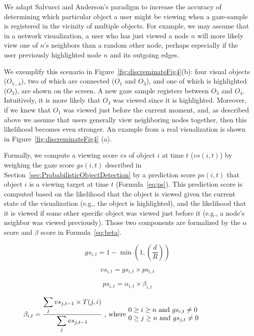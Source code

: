 We adapt Salvucci and Anderson's paradigm to increase the accuracy of determining which particular object a user might be viewing when a gaze-sample is registered in the vicinity of multiple objects. For example, we may assume that in a network visualization, a user who has just viewed a node $n$ will more likely view one of $n$'s neighbors than a random other node, perhaps especially if the user previously highlighted node $n$ and its outgoing edges.  

We exemplify this scenario in Figure~\ref{fig:discreminateFig4}(b): four visual objects ($O_{1\ldots 4}$), two of which are connected ($O_1$ and $O_3$), and one of which is highlighted ($O_3$), are shown on the screen. A new gaze sample registers between $O_3$ and $O_4$. Intuitively, it is more likely that $O_3$ was viewed since it is highlighted. Moreover, if we knew that $O_1$ was viewed just before the current moment, and, as described above we assume that users generally view neighboring nodes together, then this likelihood becomes even stronger.  An example from a real visualization is shown in Figure~\ref{fig:discreminateFig4} (a).

Formally, we compute a viewing score $vs$ of object $i$ at time $t$ ($vs(i,t)$) by weighing the gaze score $gs(i,t)$ described in Section~\ref{sec:ProbabilisticObjectDetection} by a prediction score $ps(i,t)$ that object $i$ is a viewing target at time $t$ (Formula~\ref{eq:ps}). This prediction score is computed based on the likelihood that the object is viewed given the current state of the visualization (e.g., the object is highlighted), and the likelihood that it is viewed if some other specific object was viewed just before it (e.g., a node's neighbor was viewed previously). Those two components are formalized by the  $\alpha$ score and $\beta$ score in Formula~\ref{eq:beta}.

\begin{equation}
gs_{i,t} = 1 - \min (1, (\frac{d}{R}))
\label{eq:GS}
\end{equation}

\begin{equation}
vs_{i,t} = gs_{i,t} \times ps_{i,t}
\label{eq:VS}
\end{equation}

\begin{equation}
ps_{i,t} = \alpha_{i,t} \times \beta_{i,t}
\label{eq:ps}
\end{equation}

\begin{equation}
\beta_{i,t} = \frac{\displaystyle\sum_{j} {vs_{j,t-1} \times T(j,i)}}{\displaystyle\sum_{j} vs_{j,t-1}} \text{ , where  } \parbox{15em}{$0\geq i \geq n$ and $gs_{i,t} \neq 0$\\ $0\geq j \geq n$ and $gs_{j,t} \neq 0$}
\label{eq:beta}
\end{equation}


